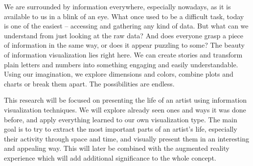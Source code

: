 We are surrounded by information everywhere, especially nowadays, as it is available to us in a blink of an eye. What once used to be a
difficult task, today is one of the easiest -- accessing and gathering any kind of data. But what can we understand from just looking at the raw
data? And does everyone grasp a piece of information in the same way, or does it appear puzzling to some? The beauty of information
visualization lies right here. We can create stories and transform plain letters and numbers into something engaging and easily understandable.
Using our imagination, we explore dimensions and colors, combine plots and charts or break them apart. The possibilities are endless.

This research will be focused on presenting the life of an artist using information visualization techniques. We will explore already seen ones
and ways it was done before, and apply everything learned to our own visualization type. The main goal is to try to extract the most important
parts of an artist's life, especially their activity through space and time, and visually present them in an interesting and appealing way. This
will later be combined with the augmented reality experience which will add additional significance to the whole concept.
